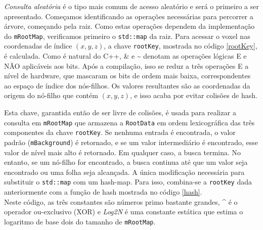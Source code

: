 \documentclass[12pt, a4paper, oneside]{book}
\begin{document}
\emph{Consulta aleatória} é o tipo mais comum de acesso aleatório e será o primeiro a ser apresentado. Começamos identificando as operações necessárias para percorrer a árvore, começando pela raiz. Como estas operações dependem da implementação do \texttt{mRootMap}, verificamos primeiro o \texttt{std::map} da raiz. Para acessar o voxel nas coordenadas de índice $(x, y, z)$, a chave \texttt{rootKey}, mostrada no código \ref{rootKey}, é calculada. Como é natural do C++, \& e \~\; denotam as operações lógicas E e NÃO aplicáveis aos bits. Após a compilação, isso se reduz a três operações E a nível de hardware, que mascaram os bits de ordem mais baixa, correspondentes ao espaço de índice dos nós-filhos. Os valores resultantes são as coordenadas da origem do nó-filho que contém $(x, y, z)$, e isso acaba por evitar colisões de hash. 



Esta chave, garantida então de ser livre de colisões, é usada para realizar a consulta em \texttt{mRootMap} que armazena a \texttt{RootData} em ordem lexicográfica das três componentes da chave \texttt{rootKey}. Se nenhuma entrada é encontrada, o valor padrão (\texttt{mBackground}) é retornado, e se um valor intermediário é encontrado, esse valor de nível mais alto é retornado. Em qualquer caso, a busca termina. No entanto, se um nó-filho for encontrado, a busca continua até que um valor seja encontrado ou uma folha seja alcançada. A única modificação necessária para substituir o \texttt{std::map} com um hash-map. Para isso, combina-se a \texttt{rootKey} dada anteriormente com a função de hash mostrada no código \ref{hash}. \\



Neste código, as três constantes são números primo bastante grandes, \^\; é o operador ou-exclusivo (XOR) e {\it Log2N} é uma constante estática que estima o logaritmo de base dois do tamanho de \texttt{mRootMap}. \\


\end{document}
